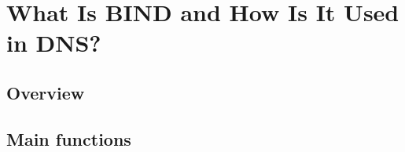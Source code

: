 \section{What Is BIND and How Is It Used in DNS?}\label{sec:bind}


\subsection{Overview}\label{sec:bind-overview}

\subsection{Main functions}\label{sec:bind-functions}
